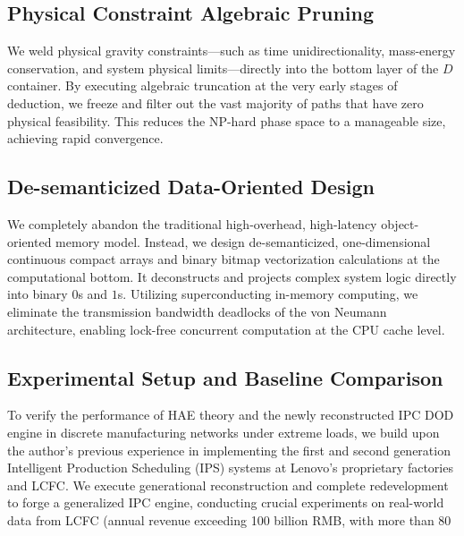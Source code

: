 \documentclass[11pt,a4paper]{article}
\begin{document}
\subsection{Physical Constraint Algebraic Pruning}
We weld physical gravity constraints—such as time unidirectionality, mass-energy conservation, and system physical limits—directly into the bottom layer of the $D$ container. By executing algebraic truncation at the very early stages of deduction, we freeze and filter out the vast majority of paths that have zero physical feasibility. This reduces the NP-hard phase space to a manageable size, achieving rapid convergence.

\subsection{De-semanticized Data-Oriented Design}
We completely abandon the traditional high-overhead, high-latency object-oriented memory model. Instead, we design de-semanticized, one-dimensional continuous compact arrays and binary bitmap vectorization calculations at the computational bottom. It deconstructs and projects complex system logic directly into binary $0$s and $1$s. Utilizing superconducting in-memory computing, we eliminate the transmission bandwidth deadlocks of the von Neumann architecture, enabling lock-free concurrent computation at the CPU cache level.

\subsection{Experimental Setup and Baseline Comparison}
To verify the performance of HAE theory and the newly reconstructed IPC DOD engine in discrete manufacturing networks under extreme loads, we build upon the author's previous experience in implementing the first and second generation Intelligent Production Scheduling (IPS) systems at Lenovo's proprietary factories and LCFC. We execute generational reconstruction and complete redevelopment to forge a generalized IPC engine, conducting crucial experiments on real-world data from LCFC (annual revenue exceeding 100 billion RMB, with more than 80%
\end{document}
